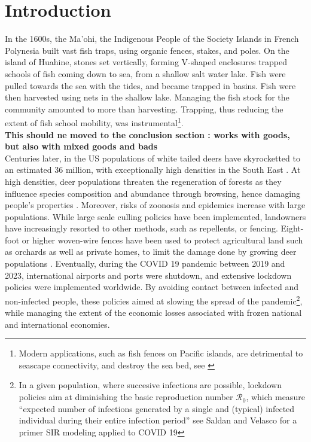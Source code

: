\newpage


\section{Introduction}
\onehalfspacing
In the 1600s, the Ma'ohi,  the Indigenous People of the Society Islands in French Polynesia \citep{oliver2019} built vast fish traps, using organic fences, stakes, and poles. On the island of Huahine, stones set vertically, forming V-shaped enclosures trapped schools of fish coming down to sea, from a shallow salt water lake. Fish were pulled towards the sea with the tides, and became trapped in basins. Fish were then harvested using nets in the shallow lake. Managing the fish stock for the community amounted to more than harvesting.  Trapping, thus reducing the extent of fish school mobility, was instrumental\footnote{Modern applications, such as fish fences on Pacific islands, are detrimental to seascape connectivity, and destroy the sea bed, see \cite{exton_artisanal_2019}}.
\\
\textbf{This should ne moved to the conclusion section : works with goods, but also with mixed goods and bads}
\\
Centuries later, in the US populations of white tailed deers have skyrocketted to an estimated 36 million, with exceptionally high densities in the South East \citep{hanberry_regaining_2020}. 
At high densities, deer populations threaten the regeneration of forests as they influence species composition and abundance through browsing, hence damaging people's properties \citep{hanberry_does_2019}. Moreover, risks of zoonosis and epidemics increase with large populations. While large scale culling policies have been implemented, landowners have increasingly resorted to other methods, such as repellents, or fencing. Eight-foot or higher woven-wire fences have been used to protect agricultural land such as orchards as well as private homes, to limit the damage done by growing deer populations \citep{caslick_economic_1979}.
 Eventually, during the COVID 19 pandemic between 2019 and 2023, international airports and ports were shutdown, and extensive lockdown policies were implemented worldwide. By avoiding contact between infected and non-infected people, these policies aimed at slowing the spread of the pandemic\footnote{In a given population, where succesive infections are possible, lockdown policies aim at diminishing the basic reproduction number $\mathcal{R}_0$, which measure ``expected number of infections generated by a single and (typical) infected individual during their entire infection period'' see Saldan and Velasco for a primer SIR modeling applied to COVID 19}, while managing the extent of the economic losses associated with frozen national and international economies. 

